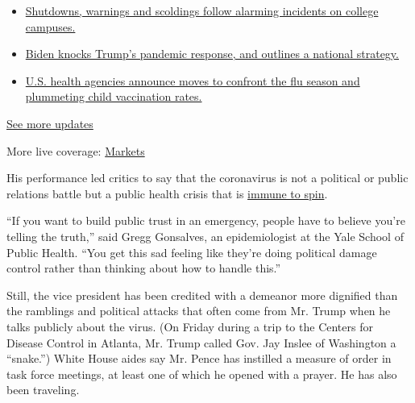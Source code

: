 \begin{itemize}
\tightlist
\item
  \href{https://www.nytimes3xbfgragh.onion/2020/08/20/world/coronavirus-covid.html?action=click\&pgtype=Article\&state=default\&region=MAIN_CONTENT_1\&context=storylines_live_updates\#link-68774d88}{Shutdowns,
  warnings and scoldings follow alarming incidents on college campuses.}
\item
  \href{https://www.nytimes3xbfgragh.onion/2020/08/20/world/coronavirus-covid.html?action=click\&pgtype=Article\&state=default\&region=MAIN_CONTENT_1\&context=storylines_live_updates\#link-26b58724}{Biden
  knocks Trump's pandemic response, and outlines a national strategy.}
\item
  \href{https://www.nytimes3xbfgragh.onion/2020/08/20/world/coronavirus-covid.html?action=click\&pgtype=Article\&state=default\&region=MAIN_CONTENT_1\&context=storylines_live_updates\#link-4e542da3}{U.S.
  health agencies announce moves to confront the flu season and
  plummeting child vaccination rates.}
\end{itemize}

\href{https://www.nytimes3xbfgragh.onion/2020/08/20/world/coronavirus-covid.html?action=click\&pgtype=Article\&state=default\&region=MAIN_CONTENT_1\&context=storylines_live_updates}{See
more updates}

More live coverage:
\href{https://www.nytimes3xbfgragh.onion/live/2020/08/20/business/stock-market-today-coronavirus?action=click\&pgtype=Article\&state=default\&region=MAIN_CONTENT_1\&context=storylines_live_updates}{Markets}

His performance led critics to say that the coronavirus is not a
political or public relations battle but a public health crisis that is
\href{https://www.nytimes3xbfgragh.onion/2020/02/28/us/politics/cpac-coronavirus.html}{immune
to spin}.

``If you want to build public trust in an emergency, people have to
believe you're telling the truth,'' said Gregg Gonsalves, an
epidemiologist at the Yale School of Public Health. ``You get this sad
feeling like they're doing political damage control rather than thinking
about how to handle this.''

Still, the vice president has been credited with a demeanor more
dignified than the ramblings and political attacks that often come from
Mr. Trump when he talks publicly about the virus. (On Friday during a
trip to the Centers for Disease Control in Atlanta, Mr. Trump called
Gov. Jay Inslee of Washington a ``snake.'') White House aides say Mr.
Pence has instilled a measure of order in task force meetings, at least
one of which he opened with a prayer. He has also been traveling.

